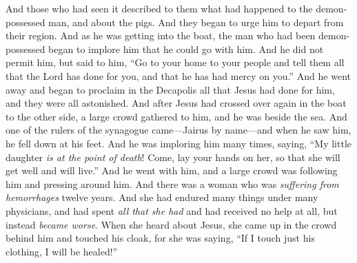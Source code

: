\begin{biblechapter}
\verse And those who had seen it described to them what had happened to the demon-possessed man, and about the pigs.
\verse And they began to urge him to depart from their region.
\verse And as he was getting into the boat, the man who had been demon-possessed began to implore him that he could go with him.
\verse And he did not permit him, but said to him, “Go to your home to your people and tell them all that the Lord has done for you, and that he has had mercy on you.”
\verse And he went away and began to proclaim in the Decapolis all that Jesus had done for him, and they were all astonished.
 And after Jesus had crossed over again in the boat to the other side, a large crowd gathered to him, and he was beside the sea.
\verse And one of the rulers of the synagogue came—Jairus by name—and when he saw him, he fell down at his feet.
\verse And he was imploring him many times, saying, “My little daughter \textit{is at the point of death}! Come, lay your hands on her, so that she will get well and will live.”
\verse And he went with him, and a large crowd was following him and pressing around him.
\verse And there was a woman who was \textit{suffering from hemorrhages} twelve years.
\verse And she had endured many things under many physicians, and had spent \textit{all that she had} and had received no help at all, but instead \textit{became worse}.
\verse When she heard about Jesus, she came up in the crowd behind him and touched his cloak,
\verse for she was saying, “If I touch just his clothing, I will be healed!”

\end{biblechapter}
